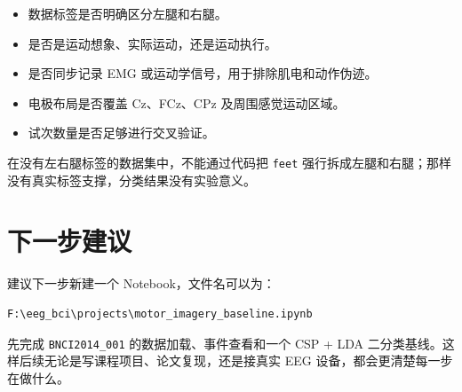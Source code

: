\documentclass[UTF8,a4paper,12pt]{ctexart}
\begin{document}
\begin{itemize}
  \item 数据标签是否明确区分左腿和右腿。
  \item 是否是运动想象、实际运动，还是运动执行。
  \item 是否同步记录 EMG 或运动学信号，用于排除肌电和动作伪迹。
  \item 电极布局是否覆盖 Cz、FCz、CPz 及周围感觉运动区域。
  \item 试次数量是否足够进行交叉验证。
\end{itemize}

在没有左右腿标签的数据集中，不能通过代码把 \texttt{feet} 强行拆成左腿和右腿；那样没有真实标签支撑，分类结果没有实验意义。

\section{下一步建议}

建议下一步新建一个 Notebook，文件名可以为：

\begin{lstlisting}[language={}]
F:\eeg_bci\projects\motor_imagery_baseline.ipynb
\end{lstlisting}

先完成 \texttt{BNCI2014\_001} 的数据加载、事件查看和一个 CSP + LDA 二分类基线。这样后续无论是写课程项目、论文复现，还是接真实 EEG 设备，都会更清楚每一步在做什么。
\end{document}
